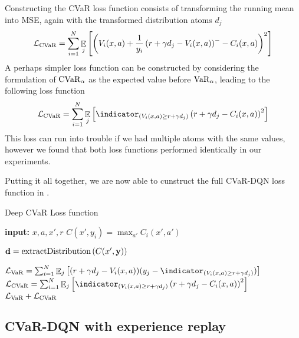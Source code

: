 Constructing the CVaR loss function consists of transforming the running mean into MSE, again with the transformed distribution atoms $d_j$
\begin{equation}
\mathcal{L}_{\text{CVaR}}=\sum_{i=1}^{N} \mathop{\mathbb{E}}_j\left[ {\left( {V_i(x, a) + \frac{1}{y_i} \left( {r + \gamma d_j - V_i(x, a)} \right)^- - C_i(x, a)} \right)^2} \right]
\end{equation}
A perhaps simpler loss function can be constructed by considering the formulation of $\text{CVaR}_\alpha$ as the expected value before $\text{VaR}_\alpha$, leading to the following loss function
\begin{equation}
\mathcal{L}_{\cvar}=\sum_{i=1}^{N} \expect_j\bsquare{\indicator_{(V_i(x, a) \ge r + \gamma d_j)}\bround{r + \gamma d_j - C_i(x, a)}^2}
\end{equation}
This loss can run into trouble if we had multiple atoms with the same values, however we found  that both loss functions performed identically in our experiments.

Putting it all together, we are now able to cunstruct the full CVaR-DQN loss function in .

\begin{algorithm}
\caption{Deep CVaR Loss function}
\begin{algorithmic}\label{alg:cvardqnloss}

    \STATE \textbf{input:} $x, a, x', r$
    \bindent
	\STATE $C(x', y_i) = \max_{a'} C_i(x', a')$
	\ENDFOR
	
	\STATE $\mathbf{d}= \text{extractDistribution}\left( {C(x', \mathbf{y})} \right)$

	
	\STATE $\mathcal{L}_{\var}=\sum_{i=1}^{N} \expect_j\bsquare{(r + \gamma d_j - V_i(x, a))(y_j - \indicator_{(V_i(x, a) \ge r + \gamma d_j)})}$
	\STATE $\mathcal{L}_{\cvar}=\sum_{i=1}^{N} \expect_j\bsquare{\indicator_{(V_i(x, a) \ge r + \gamma d_j)}\bround{r + \gamma d_j - C_i(x, a)}^2}$
	\eindent
	\RETURN $\mathcal{L}_{\text{VaR}} + \mathcal{L}_{\text{CVaR}}$
	
\end{algorithmic}
\end{algorithm}

\subsection{CVaR-DQN with experience replay}

